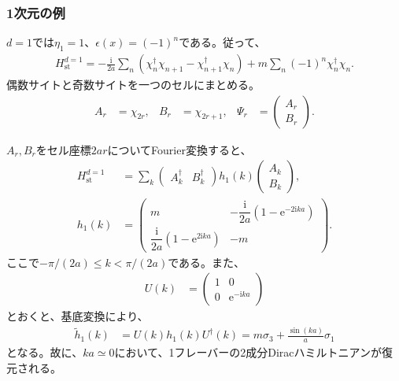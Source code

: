 \documentclass[a4paper,10.5pt]{article}
\numberwithin{equation}{section}
\providecommand{\ii}{\mathrm{i}}
\providecommand{\ee}{\mathrm{e}}
\providecommand{\st}{\mathrm{st}}
\begin{document}
\subsubsection{1次元の例}
$d=1$では$\eta_1=1$、$\epsilon(x)=(-1)^n$である。従って、
\begin{align}
H_{\st}^{d=1}
=-\frac{\ii}{2a}\sum_n(\chi_n^\dagger\chi_{n+1}
-\chi_{n+1}^\dagger\chi_n)
+m\sum_n(-1)^n\chi_n^\dagger\chi_n.
\end{align}
偶数サイトと奇数サイトを一つのセルにまとめる。
\begin{align}
A_r&=\chi_{2r},&B_r&=\chi_{2r+1},&
\Psi_r&=\begin{pmatrix}A_r\\B_r\end{pmatrix}.
\end{align}
\begin{center}
\end{center}
$A_r,B_r$をセル座標$2ar$についてFourier変換すると、
\begin{align}
H_{\st}^{d=1}
&=\sum_k\begin{pmatrix}A_k^\dagger&B_k^\dagger\end{pmatrix}
h_1(k)\begin{pmatrix}A_k\\B_k\end{pmatrix},\\
h_1(k)&=\begin{pmatrix}
m&-\dfrac{\ii}{2a}(1-\ee^{-2\ii ka})\\
\dfrac{\ii}{2a}(1-\ee^{2\ii ka})&-m
\end{pmatrix}.
\end{align}
ここで$-\pi/(2a)\leq k<\pi/(2a)$である。また、
\begin{align}
U(k)&=\begin{pmatrix}1&0\\0&\ee^{-\ii ka}\end{pmatrix}
\end{align}
とおくと、基底変換により、
\begin{align}
\widetilde h_1(k)&=U(k)h_1(k)U^\dagger(k)
=m\sigma_3+\frac{\sin(ka)}a\sigma_1
\end{align}
となる。故に、$ka\simeq0$において、1フレーバーの2成分Diracハミルトニアンが復元される。
\end{document}
